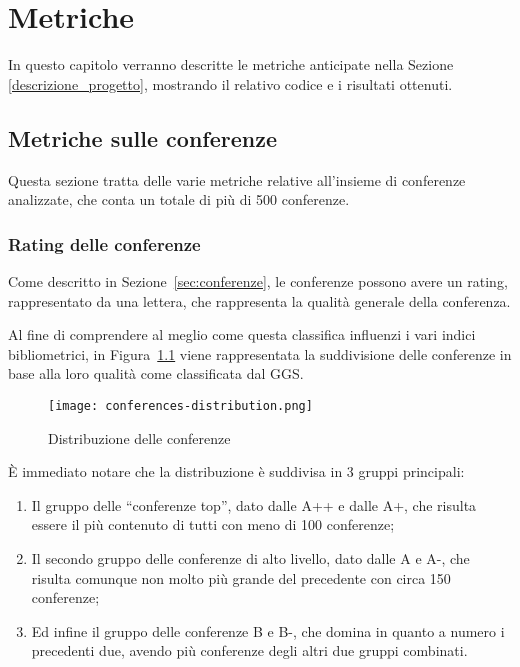 \chapter{Metriche}

In questo capitolo verranno descritte le metriche anticipate nella Sezione
\ref{descrizione_progetto}, mostrando il relativo codice e i risultati ottenuti.

\section{Metriche sulle conferenze}

Questa sezione tratta delle varie metriche relative all'insieme di conferenze
analizzate, che conta un totale di più di 500 conferenze.

\subsection{Rating delle conferenze}
\label{sec:distrib-conferenze}

Come descritto in Sezione~\ref{sec:conferenze}, le conferenze possono avere
un rating, rappresentato da una lettera, che rappresenta la qualità generale
della conferenza.

Al fine di comprendere al meglio come questa classifica influenzi i vari indici
bibliometrici, in Figura~\ref{fig:conferences-distribution} viene rappresentata
la suddivisione delle conferenze in base alla loro qualità come classificata
dal GGS.

\begin{figure}[tb]
  \centering
  \texttt{[image: conferences-distribution.png]}
  \caption{Distribuzione delle conferenze}
  \label{fig:conferences-distribution}
\end{figure}

È immediato notare che la distribuzione è suddivisa in 3 gruppi principali:
\begin{enumerate}
  \item Il gruppo delle ``conferenze top'', dato dalle A++ e dalle A+, che
        risulta essere il più contenuto di tutti con meno di 100 conferenze;
  \item Il secondo gruppo delle conferenze di alto livello, dato dalle A e A-,
        che risulta comunque non molto più grande del precedente con circa 150
        conferenze;
  \item Ed infine il gruppo delle conferenze B e B-, che domina in quanto a numero
        i precedenti due, avendo più conferenze degli altri due gruppi combinati.
\end{enumerate}

